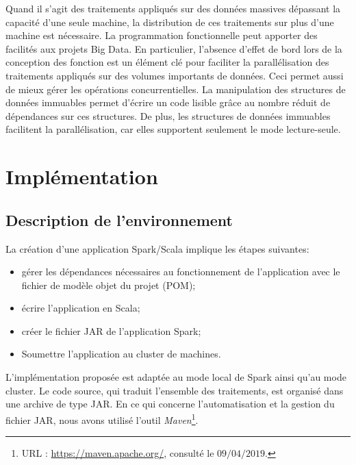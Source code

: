 Quand il s'agit des traitements appliqués sur des données massives dépassant la capacité d'une seule machine, la distribution de ces traitements sur plus d'une machine  est nécessaire. La programmation fonctionnelle peut apporter des facilités aux projets Big Data. 
En particulier, l'absence d'effet de bord lors de la conception des fonction est un élément clé pour faciliter la parallélisation des traitements appliqués sur des volumes importants de données. Ceci permet aussi de mieux gérer les opérations concurrentielles. 
La manipulation des structures de données immuables permet d'écrire un code lisible grâce au nombre réduit de dépendances sur ces structures. De plus, les structures de données immuables facilitent la parallélisation, car elles supportent seulement le mode lecture-seule.




\section{Implémentation}
\subsection{Description de l'environnement}
La création d'une application Spark/Scala implique  les étapes suivantes:
\begin{itemize}
	\item gérer les dépendances nécessaires au fonctionnement de l'application avec le fichier de modèle objet du projet (POM);
	\item écrire l'application en Scala;
	\item créer le fichier JAR de l'application Spark;
	 \item Soumettre  l'application  au cluster de machines. 
\end{itemize}

L'implémentation proposée est adaptée au mode local de Spark  ainsi qu'au  mode cluster. 
Le code source, qui traduit l'ensemble des traitements, est organisé dans une archive de type JAR.
En ce qui concerne  l'automatisation et la gestion du fichier JAR, nous avons utilisé l'outil \textit{Maven}\footnote{URL : \url{https://maven.apache.org/}, consulté le $09/04/2019$.}.


